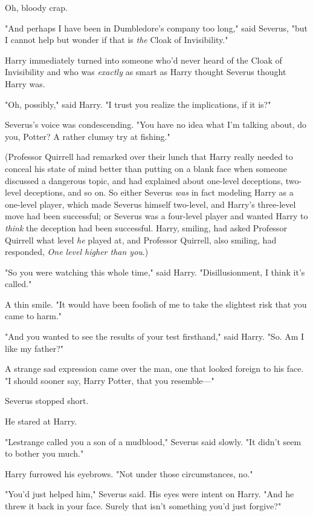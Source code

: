 Oh, bloody crap.

"And perhaps I have been in Dumbledore's company too long," said Severus, "but 
I cannot help but wonder if that is \emph{the} Cloak of Invisibility."

Harry immediately turned into someone who'd never heard of the Cloak of 
Invisibility and who was \emph{exactly} as smart as Harry thought Severus 
thought Harry was.

"Oh, possibly," said Harry. "I trust you realize the implications, if it is?"

Severus's voice was condescending. "You have no idea what I'm talking about, do 
you, Potter? A rather clumsy try at fishing."

(Professor Quirrell had remarked over their lunch that Harry really needed to 
conceal his state of mind better than putting on a blank face when someone 
discussed a dangerous topic, and had explained about one-level deceptions, 
two-level deceptions, and so on. So either Severus \emph{was} in fact modeling 
Harry as a one-level player, which made Severus himself two-level, and Harry's 
three-level move had been successful; or Severus was a four-level player and 
wanted Harry to \emph{think} the deception had been successful. Harry, smiling, 
had asked Professor Quirrell what level \emph{he} played at, and Professor 
Quirrell, also smiling, had responded, \emph{One level higher than you}.)

"So you were watching this whole time," said Harry. "Disillusionment, I think 
it's called."

A thin smile. "It would have been foolish of me to take the slightest risk that 
you came to harm."

"And you wanted to see the results of your test firsthand," said Harry. "So. Am 
I like my father?"

A strange sad expression came over the man, one that looked foreign to his 
face. "I should sooner say, Harry Potter, that you resemble---"

Severus stopped short.

He stared at Harry.

"Lestrange called you a son of a mudblood," Severus said slowly. "It didn't 
seem to bother you much."

Harry furrowed his eyebrows. "Not under those circumstances, no."

"You'd just helped him," Severus said. His eyes were intent on Harry. "And he 
threw it back in your face. Surely that isn't something you'd just forgive?"

